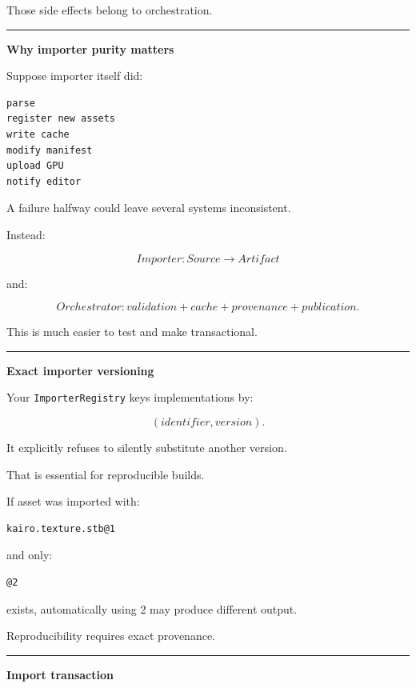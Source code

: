 Those side effects belong to orchestration.

\begin{center}\rule{0.5\linewidth}{0.5pt}\end{center}

\textbf{Why importer purity matters}

Suppose importer itself did:

\begin{verbatim}
parse
register new assets
write cache
modify manifest
upload GPU
notify editor
\end{verbatim}

A failure halfway could leave several systems inconsistent.

Instead:

\[
Importer:
Source\rightarrow Artifact
\]

and:

\[
Orchestrator:
validation + cache + provenance + publication.
\]

This is much easier to test and make transactional.

\begin{center}\rule{0.5\linewidth}{0.5pt}\end{center}

\textbf{Exact importer versioning}

Your \texttt{ImporterRegistry} keys implementations by:

\[
(identifier,version).
\]

It explicitly refuses to silently substitute another version.

That is essential for reproducible builds.

If asset was imported with:

\begin{verbatim}
kairo.texture.stb@1
\end{verbatim}

and only:

\begin{verbatim}
@2
\end{verbatim}

exists, automatically using 2 may produce different output.

Reproducibility requires exact provenance.

\begin{center}\rule{0.5\linewidth}{0.5pt}\end{center}

\textbf{Import transaction}


